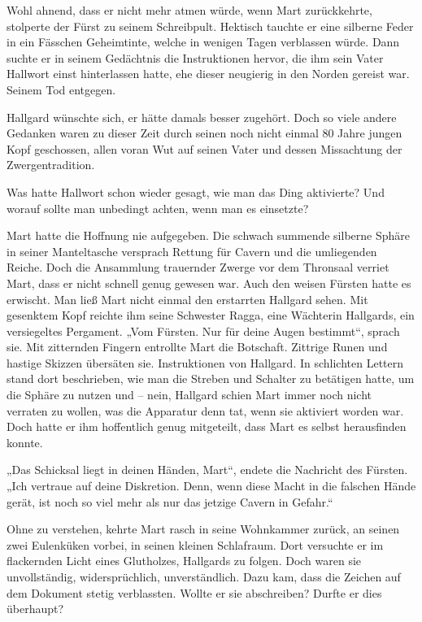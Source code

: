 Wohl ahnend, dass er nicht mehr atmen würde, wenn Mart zurückkehrte, stolperte der Fürst zu seinem Schreibpult. Hektisch tauchte er eine silberne Feder in ein Fässchen Geheimtinte, welche in wenigen Tagen verblassen würde. Dann suchte er in seinem Gedächtnis die Instruktionen hervor, die ihm sein Vater Hallwort einst hinterlassen hatte, ehe dieser neugierig in den Norden gereist war. Seinem Tod entgegen.

Hallgard wünschte sich, er hätte damals besser zugehört. Doch so viele andere Gedanken waren zu dieser Zeit durch seinen noch nicht einmal 80 Jahre jungen Kopf geschossen, allen voran Wut auf seinen Vater und dessen Missachtung der Zwergentradition.

Was hatte Hallwort schon wieder gesagt, wie man das Ding aktivierte? Und worauf sollte man unbedingt achten, wenn man es einsetzte?



\trennzeichen



Mart hatte die Hoffnung nie aufgegeben. Die schwach summende silberne Sphäre in seiner Manteltasche versprach Rettung für Cavern und die umliegenden Reiche. Doch die Ansammlung trauernder Zwerge vor dem Thronsaal verriet Mart, dass er nicht schnell genug gewesen war. Auch den weisen Fürsten hatte es erwischt. Man ließ Mart nicht einmal den erstarrten Hallgard sehen. Mit gesenktem Kopf reichte ihm seine Schwester Ragga, eine Wächterin Hallgards, ein versiegeltes Pergament. „Vom Fürsten. Nur für deine Augen bestimmt“, sprach sie. Mit zitternden Fingern entrollte Mart die Botschaft. Zittrige Runen und hastige Skizzen übersäten sie. Instruktionen von Hallgard. In schlichten Lettern stand dort beschrieben, wie man die Streben und Schalter zu betätigen hatte, um die Sphäre zu nutzen und – nein, Hallgard schien Mart immer noch nicht verraten zu wollen, was die Apparatur denn tat, wenn sie aktiviert worden war. Doch hatte er ihm hoffentlich genug mitgeteilt, dass Mart es selbst herausfinden konnte. 

„Das Schicksal liegt in deinen Händen, Mart“, endete die Nachricht des Fürsten. „Ich vertraue auf deine Diskretion. Denn, wenn diese Macht in die falschen Hände gerät, ist noch so viel mehr als nur das jetzige Cavern in Gefahr.“



\trennzeichen



Ohne zu verstehen, kehrte Mart rasch in seine Wohnkammer zurück, an seinen zwei Eulenküken vorbei, in seinen kleinen Schlafraum. Dort versuchte er im flackernden Licht eines Glutholzes, Hallgards zu folgen. Doch waren sie unvollständig, widersprüchlich, unverständlich. Dazu kam, dass die Zeichen auf dem Dokument stetig verblassten. Wollte er sie abschreiben? Durfte er dies überhaupt?

